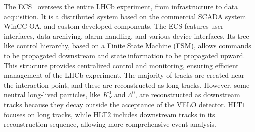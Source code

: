 The ECS~\cite{GranadoCardoso:2702137} oversees the entire LHCb experiment, from infrastructure to data acquisition. It is a distributed system based on the commercial SCADA system WinCC OA, and custom-developed components. The ECS features user interfaces, data archiving, alarm handling, and various device interfaces. Its tree-like control hierarchy, based on a Finite State Machine (FSM), allows commands to be propagated downstream and state information to be propagated upward. This structure provides centralized control and monitoring, ensuring efficient management of the LHCb experiment.
The majority of tracks are created near the interaction point, and these are reconstructed as long tracks. However, some neutral long-lived particles, like $K^0_S$ and $\Lambda^0$, are reconstructed as downstream tracks because they decay outside the acceptance of the VELO detector. HLT$1$ focuses on long tracks, while HLT$2$ includes downstream tracks in its reconstruction sequence, allowing more comprehensive event analysis.



